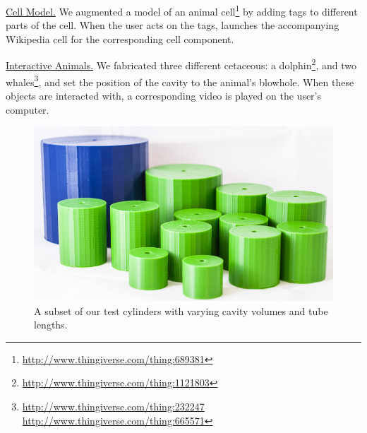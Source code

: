               \underline{Cell Model.} We augmented a model of an animal
              cell\footnote{\url{http://www.thingiverse.com/thing:689381}} by
              adding \bh tags to different parts of the cell. When the user
              acts on the tags, \bh launches the accompanying Wikipedia cell
              for the corresponding cell component.
              
              \underline{Interactive Animals.} We fabricated three different
              cetaceous: a
              dolphin\footnote{\url{http://www.thingiverse.com/thing:1121803}},
              and two
              whales\footnote{\url{http://www.thingiverse.com/thing:232247}\\
              \url{http://www.thingiverse.com/thing:665571}}, and set the
              position of the cavity to the animal's blowhole. When these
              objects are interacted with, a corresponding video is played on
              the user's computer.
            
            \begin{figure}
              \centering
              \includegraphics[width=.95\columnwidth]{figures/cylinders.jpg}
              \caption{A subset of our test cylinders with varying cavity
                volumes and tube lengths.}
              \label{fig:cylinders}
            \end{figure}
            
